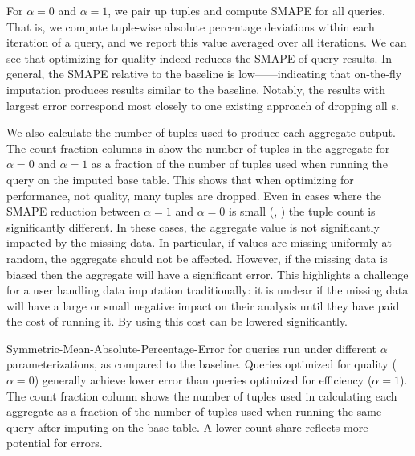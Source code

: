 For $\alpha=0$ and $\alpha=1$, we pair up tuples and compute SMAPE for all queries. That is,
we compute tuple-wise absolute percentage deviations within each iteration of a query, and
we report this value averaged over all iterations.  We
can see that optimizing for quality indeed reduces the SMAPE of query results.  In general, the SMAPE relative 
to the baseline is low------indicating that on-the-fly imputation produces results similar to the baseline. Notably, the results with largest error correspond
most closely to one existing approach of dropping all \nullv{}s.

We also calculate the number of tuples used to produce each aggregate output.
The count fraction columns in  show the number of tuples in the aggregate for $\alpha = 0$ and $\alpha = 1$ as a fraction of the number of tuples used when running the query on the imputed base table.
This shows that when optimizing for performance, not quality, many tuples are dropped.
Even in cases where the SMAPE reduction between $\alpha = 1$ and $\alpha = 0$ is small (, ) the tuple count is significantly different.
In these cases, the aggregate value is not significantly impacted by the missing data. In particular, if values are missing uniformly at random,
the aggregate should not be affected.
However, if the missing data is biased then the aggregate will have a significant error.
This highlights a challenge for a user handling data imputation traditionally: it is unclear if the missing data will have a large or small negative impact on their analysis until they have paid the cost of running it.
By using \ProjectName{} this cost can be lowered significantly.


\begin{table}
\centering

\caption{Symmetric-Mean-Absolute-Percentage-Error for queries run under different $\alpha$ parameterizations, as compared to the baseline.
Queries optimized
    for quality ($\alpha=0$) generally achieve lower error than queries optimized for
    efficiency ($\alpha=1$). The count fraction column shows the number of tuples used in calculating each aggregate
     as a fraction of the number of tuples used when running the same query after imputing on the base table.
    A lower count share reflects more potential for errors.}
\label{table:smape}
\end{table}

